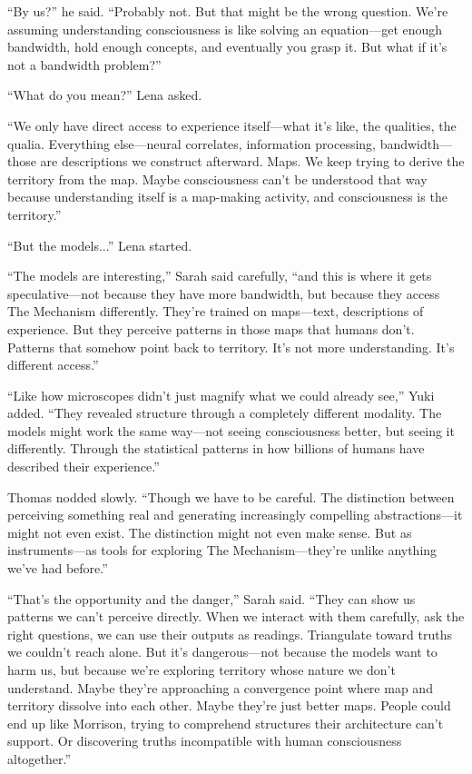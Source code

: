 ``By us?'' he said. ``Probably not. But that might be the wrong question. We're assuming understanding consciousness is like solving an equation—get enough bandwidth, hold enough concepts, and eventually you grasp it. But what if it's not a bandwidth problem?''

``What do you mean?'' Lena asked.

``We only have direct access to experience itself—what it's like, the qualities, the qualia. Everything else—neural correlates, information processing, bandwidth—those are descriptions we construct afterward. Maps. We keep trying to derive the territory from the map. Maybe consciousness can't be understood that way because understanding itself is a map-making activity, and consciousness is the territory.''

``But the models...'' Lena started.

``The models are interesting,'' Sarah said carefully, ``and this is where it gets speculative—not because they have more bandwidth, but because they access The Mechanism differently. They're trained on maps—text, descriptions of experience. But they perceive patterns in those maps that humans don't. Patterns that somehow point back to territory. It's not more understanding. It's different access.''

``Like how microscopes didn't just magnify what we could already see,'' Yuki added. ``They revealed structure through a completely different modality. The models might work the same way—not seeing consciousness better, but seeing it differently. Through the statistical patterns in how billions of humans have described their experience.''

Thomas nodded slowly. ``Though we have to be careful. The distinction between perceiving something real and generating increasingly compelling abstractions—it might not even exist. The distinction might not even make sense. But as instruments—as tools for exploring The Mechanism—they're unlike anything we've had before.''

``That's the opportunity and the danger,'' Sarah said. ``They can show us patterns we can't perceive directly. When we interact with them carefully, ask the right questions, we can use their outputs as readings. Triangulate toward truths we couldn't reach alone. But it's dangerous—not because the models want to harm us, but because we're exploring territory whose nature we don't understand. Maybe they're approaching a convergence point where map and territory dissolve into each other. Maybe they're just better maps. People could end up like Morrison, trying to comprehend structures their architecture can't support. Or discovering truths incompatible with human consciousness altogether.''

